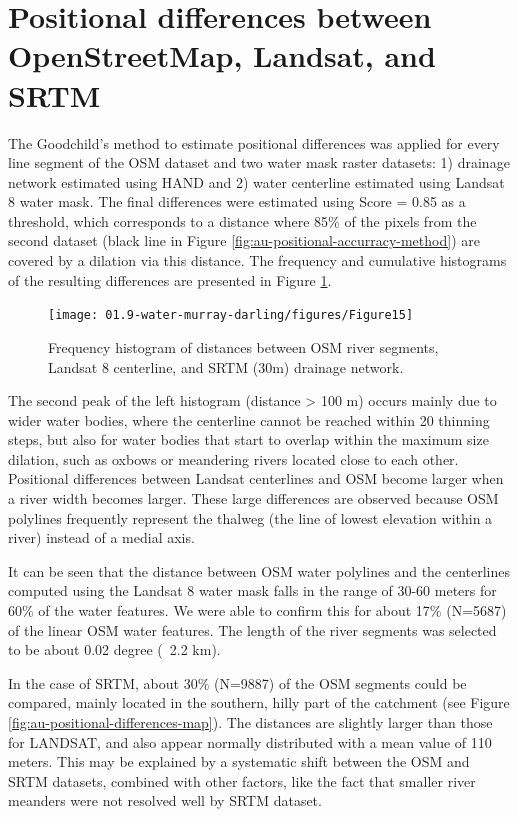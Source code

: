\section {Positional differences between OpenStreetMap, Landsat, and SRTM}
The Goodchild’s method to estimate positional differences was applied for every line segment of the OSM dataset and two water mask raster datasets: 1) drainage network estimated using \gls{HAND} and 2) water centerline estimated using Landsat 8 water mask. The final differences were estimated using Score = 0.85 as a threshold, which corresponds to a distance where 85\% of the pixels from the second dataset (black line in Figure \ref{fig:au-positional-accurracy-method}) are covered by a dilation via this distance. The frequency and cumulative histograms of the resulting differences are presented in Figure \ref{fig:au-positional-differences}. 

\begin{figure}
	\centering
	\texttt{[image: 01.9-water-murray-darling/figures/Figure15]}
	\caption{Frequency histogram of distances between OSM river segments, Landsat 8 centerline, and \gls{SRTM} (30m) drainage network.}
	\label{fig:au-positional-differences}
\end{figure}
 
The second peak of the left histogram (distance > 100 m) occurs mainly due to wider water bodies, where the centerline cannot be reached within 20 thinning steps, but also for water bodies that start to overlap within the maximum size dilation, such as oxbows or meandering rivers located close to each other.  Positional differences between Landsat centerlines and OSM become larger when a river width becomes larger. These large differences are observed because OSM polylines frequently represent the thalweg (the line of lowest elevation within a river) instead of a medial axis.

It can be seen that the distance between OSM water polylines and the centerlines computed using the Landsat 8 water mask falls in the range of 30-60 meters for 60\% of the water features. We were able to confirm this for about 17\% (N=5687) of the linear OSM water features. The length of the river segments was selected to be about 0.02 degree (~2.2 km). 

In the case of \gls{SRTM}, about 30\% (N=9887) of the OSM segments could be compared, mainly located in the southern, hilly part of the catchment (see Figure \ref{fig:au-positional-differences-map}). The distances are slightly larger than those for LANDSAT, and also appear normally distributed with a mean value of 110 meters. This may be explained by a systematic shift between the OSM and \gls{SRTM} datasets, combined with other factors, like the fact that smaller river meanders were not resolved well by \gls{SRTM} dataset.


